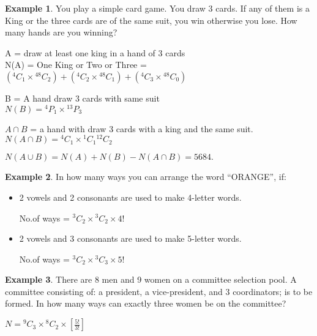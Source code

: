 \documentclass[12pt]{article}
\theoremstyle{definition}
\newtheorem{exmp}{Example}[section]
\newcommand*{\Perm}[2]{{}^{#1}\!P_{#2}}%
\newcommand*{\Comb}[2]{{}^{#1}C_{#2}}%
\begin{document}
\begin{exmp}
    You play a simple card game. You draw 3 cards. If any of them is a King or
    the three cards are of the same suit, you win otherwise you lose.
    How many hands are you winning? 
    \begin{center}
        A = draw at least one king in a hand of 3 cards \\
        N(A) = One King or Two or Three = \\
        $ (\Comb{4}{1} \times \Comb{48}{2})+ (\Comb{4}{2} \times \Comb{48}{1})
        + (\Comb{4}{3} \times \Comb{48}{0})
        $
    \end{center}    
    \begin{center}
        B = A hand draw 3 cards with  same suit \\
        $N(B) = \Perm{4}{1} \times \Perm{13}{3}$ \\
    \end{center}   
    \begin{center}
        $A \cap B$ = a hand with draw 3 cards with a king and the same suit.
        $N(A \cap B) = \Comb{4}{1} \times \Comb{1}{1} \Comb{12}{2}  $
    \end{center}   
    \begin{center}
        $N(A \cup  B) = N(A) + N(B) - N(A \cap B) = 5684.$    
    \end{center}
\end{exmp}    

\begin{exmp}
    In how many ways you can arrange the word “ORANGE”, if: 
    \begin{itemize}
        \item 2 vowels and 2 consonants are used to make 4-letter words.  
            \begin{center}
                No.of ways = $\Comb{3}{2} \times \Comb{3}{2} \times 4! $
            \end{center}   
        \item 2 vowels and 3 consonants are used to make 5-letter words. 
            \begin{center}
                No.of ways = $\Comb{3}{2} \times \Comb{3}{3} \times 5! $
            \end{center}   
        \end{itemize}
\end{exmp}
\begin{exmp}
    There are 8 men and 9 women on a committee selection pool.
    A committee consisting of:
    a president, a vice-president, and 3 coordinators; is to
    be formed.  
    In how many ways can exactly three women be on the committee?
    \begin{center}
        $\displaystyle N = \Comb{9}{3} \times \Comb{8}{2}  \times [\frac{5!}{3!}]$  
    \end{center}

\end{exmp}    
\end{document}
